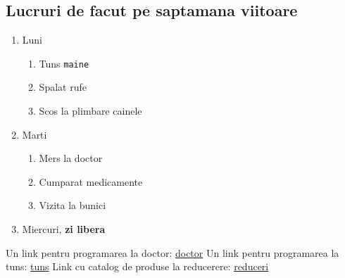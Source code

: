 \documentclass{article}
\begin{document}
\subsection{Lucruri de facut pe saptamana viitoare}
\begin{enumerate}
    \item Luni
    \begin{enumerate}
        \item Tuns \texttt{maine}
        \item Spalat rufe   
        \item Scos la plimbare cainele
    \end{enumerate}
    \item Marti
    \begin{enumerate}
        \item Mers la doctor
        \item Cumparat medicamente
        \item Vizita la bunici
    \end{enumerate}
    \item Miercuri, \textbf{zi libera}
\end{enumerate}

Un link pentru programarea la doctor: \href{https://www.google.com/doctor}{doctor}
Un link pentru programarea la tuns: \href{https://www.google.com/tuns}{tuns}
Link cu catalog de produse la reducerere: \href{https://www.google.com/reduceri}{reduceri}
\end{document}
